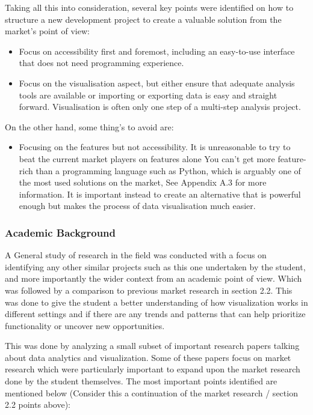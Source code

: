 Taking all this into consideration, several key points were identified on how to structure a new development project to create a valuable solution from the market’s point of view:

\begin{itemize}
    \item Focus on accessibility first and foremost, including an easy-to-use interface that does not need programming experience.
    \item Focus on the visualisation aspect, but either ensure that adequate analysis tools are available or importing or exporting data is easy and straight forward. Visualisation is often only one step of a multi-step analysis project.
\end{itemize}

On the other hand, some thing’s to avoid are:

\begin{itemize}
    \item Focusing on the features but not accessibility. It is unreasonable to try to beat the current market players on features alone You can’t get more feature-rich than a programming language such as Python, which is arguably one of the most used solutions on the market, See Appendix A.3 for more information. It is important instead to create an alternative that is powerful enough but makes the process of data visualisation much easier.
\end{itemize}

\subsubsection{Academic Background}
A General study of research in the field was conducted with a focus on identifying any other similar projects such as this one undertaken by the student, and more importantly the wider context from an academic point of view. Which was followed by a comparison to previous market research in section 2.2. This was done to give the student a better understanding of how visualization works in different settings and if there are any trends and patterns that can help prioritize functionality or uncover new opportunities.

This was done by analyzing a small subset of important research papers talking about data analytics and visualization. Some of these papers focus on market research which were particularly important to expand upon the market research done by the student themselves. The most important points identified are mentioned below (Consider this a continuation of the market research / section 2.2 points above):

